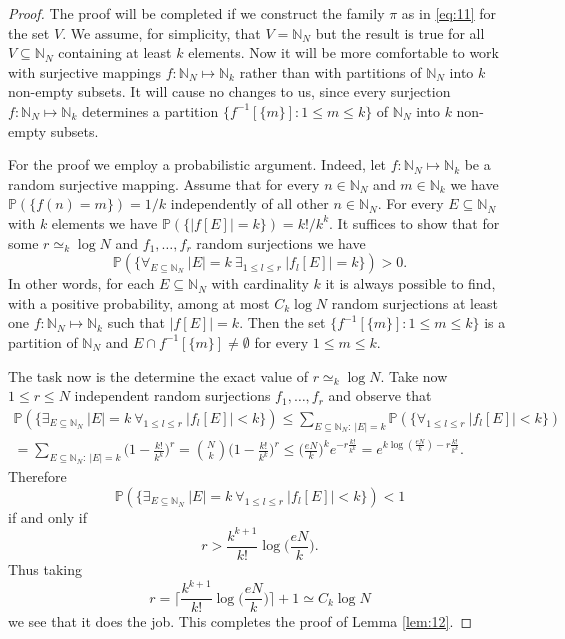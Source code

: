 \documentclass[a4paper,oneside]{amsart}
\theoremstyle{plain}
\theoremstyle{definition}
\numberwithin{equation}{section}
\theoremstyle{plain}
\newcommand{\NN}{\mathbb{N}}
\newcommand{\8}{\infty}
\begin{document}
\begin{proof}
The proof will be completed if we construct the family $\pi$ as in
\eqref{eq:11} for the set $V$. We assume, for simplicity, that
$V=\NN_N$  but the result is
true for all $V\subseteq \NN_N$ containing at least $k$ elements. Now
it will be more comfortable to work with surjective mappings
$f:\NN_N\mapsto\NN_k$ rather than with partitions of $\NN_N$ into $k$
non-empty subsets.  It will cause no changes to us, since  every surjection 
$f:\NN_N\mapsto\NN_k$ determines a partition $\{f^{-1}[\{m\}]: 1\le
m\le k\}$ of $\NN_N$ into $k$ non-empty subsets.  

For the proof we employ a probabilistic argument.  Indeed, let
$f:\NN_N\mapsto \NN_k$ be a random surjective mapping. Assume that for
every $n\in\NN_N$ and $m\in\NN_k$ we have $\mathds{P}(\{f(n)=m\})=1/k$
independently of all other $n\in\NN_N$.  For every $E\subseteq\NN_N$
with $k$ elements we have $\mathds P(\{|f[E]|=k\})=k!/k^k$. 
It suffices to show that for some $r\simeq_k\log N$ and $f_1, \ldots,
f_r$ random surjections  we have
\[
\mathds P(\{\forall_{E\subseteq\NN_N}\ |E|=k\ \exists _{1\le l\le r}\
|f_l[E]|=k\})>0.
\]
In other words,  for each $E\subseteq\NN_N$ with cardinality $k$ it is always possible to
find, with a positive probability,  among at most $C_k\log N$ random surjections 
 at least one $f:\NN_N\mapsto \NN_k$ such that $|f[E]|=k$. Then the
 set $\{f^{-1}[\{m\}]: 1\le
m\le k\}$ is a partition of $\NN_N$ and $E\cap
f^{-1}[\{m\}]\not=\emptyset$ for every $1\le m\le k$.

 The task now is
the determine the exact value of $r\simeq_k\log N$.
Take now
$1\le r\le N$ independent random surjections $f_1, \ldots, f_r$ and observe that
\begin{multline*}
\mathds P(\{\exists_{E\subseteq\NN_N}\ |E|=k\ \forall _{1\le l\le r}\
|f_l[E]|<k\})\le \sum_{E\subseteq \NN_N:\: |E|=k}
\mathds P(\{\forall _{1\le l\le r}\
|f_l[E]|<k\})  \\
=\sum_{E\subseteq \NN_N:\:
  |E|=k}\bigg(1-\frac{k!}{k^k}\bigg)^r=\binom{N}{k}\bigg(1-\frac{k!}{k^k}\bigg)^r
\le\bigg(\frac{eN}{k}\bigg)^ke^{-r\frac{k!}{k^k}}
=e^{k\log(\frac{eN}{k})-r\frac{k!}{k^k}}.
\end{multline*}
Therefore 
\[
\mathds P(\{\exists_{E\subseteq\NN_N}\ |E|=k\ \forall _{1\le l\le r}\
|f_l[E]|<k\})<1
\]
 if and only if 
\[
r>\frac{k^{k+1}}{k!}\log\bigg(\frac{eN}{k}\bigg).
\]
Thus taking 
\[
r=\bigg\lceil\frac{k^{k+1}}{k!}\log\bigg(\frac{eN}{k}\bigg)\bigg\rceil+1\simeq
C_k\log N
\]
we see that it does the job. 
This completes the proof of Lemma \ref{lem:12}.
\end{proof}
\end{document}
